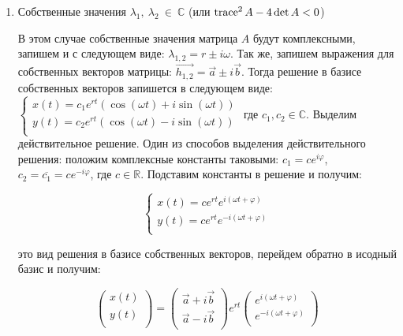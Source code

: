 \begin{enumerate}
\begin{enumerate}
  \end{enumerate}

  \item Собственные значения  $\lambda_1, ~ \lambda_2 ~ \in ~ \mathbb{C}$ (или $\operatorname{trace}^2 A - 4 \det A < 0$)

  В этом случае собственные значения матрица $A$ будут комплексными, запишем и с следующем виде:
  $\lambda_{1, 2} = r \pm i \omega$. Так же, запишем выражения для собственных векторов матрицы:
  $\vec{h_{1, 2}} = \vec{a} \pm i \vec{b}$. Тогда решение в базисе собственных векторов запишется в следующем виде:
  $\begin{cases}
    x(t) = c_1 e^{r t}(\cos (\omega t) + i \sin (\omega t)) \\
    y(t) = c_2 e^{r t}(\cos (\omega t) - i \sin (\omega t)) \\
  \end{cases}$
  где $c_1, c_2 \in \mathbb{C}$. Выделим действительное решение. Один из способов выделения действительного решения: положим комплексные константы таковыми: $c_1 = c e^{i \varphi}$, $c_2 = \overline{c_1} = c e^{-i \varphi}$, где $c \in \mathbb{R}$. Подставим константы в решение и получим:

  \begin{equation}
    \begin{cases}
      x(t) = c e^{r t} e^{i(\omega t + \varphi)} \\
      y(t) = c e^{r t} e^{-i(\omega t + \varphi)} \\
    \end{cases}
  \end{equation}

  это вид решения в базисе собственных векторов, перейдем обратно в исодный базис и получим:

  \begin{equation}
    \begin{pmatrix}
      x(t) \\
      y(t) \\
    \end{pmatrix} = 
    \begin{pmatrix}
      \vec{a} + i \vec{b} \\
      \vec{a} - i \vec{b} \\
    \end{pmatrix}
    e^{r t}
    \begin{pmatrix}
      e^{i(\omega t + \varphi)} \\
      e^{-i(\omega t + \varphi)} \\
    \end{pmatrix}
  \end{equation}


\end{enumerate}
